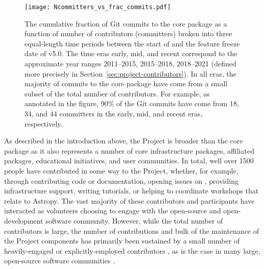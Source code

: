 \documentclass[modern]{aastex631}
\begin{document}
\begin{figure}[t!]
    \begin{centering}
      \texttt{[image: Ncommitters\_vs\_frac\_commits.pdf]}
        \caption{
            The cumulative fraction of Git commits to the \astropypkg core
            package as a function of number of contributors (committers) broken
            into three equal-length time periods between the start of \astropy
            and the feature freeze date of v5.0.
            The time eras early, mid, and recent correspond to the approximate
            year ranges 2011--2015, 2015--2018, 2018--2021 (defined more
            precisely in Section~\ref{sec:project-contributors}).
            In all eras, the majority of commits to the \astropypkg core package
            have come from a small subset of the total number of contributors.
            For example, as annotated in the figure, 90\% of the Git commits
            have come from 18, 34, and 44 committers in the early, mid, and
            recent eras, respectively.
        }
        \label{fig:contributor-summary:Ncommitters}
    \end{centering}
\end{figure}

As described in the introduction above, the \astropy Project is broader than the
core \astropypkg package as it also represents a number of core infrastructure
packages, affiliated packages, educational initiatives, and user communities.
In total, well over 1500 people have contributed in some way to the Project,
whether, for example, through contributing code or documentation, opening issues
on \github, providing infrastructure support, writing tutorials, or helping to
coordinate workshops that relate to Astropy.
The vast majority of these contributors and participants have interacted as
volunteers choosing to engage with the open-source and open-development software
community.
However, while the total number of contributors is large, the number of
contributions and bulk of the maintenance of the \astropy Project components has
primarily been sustained by a small number of heavily-engaged or
explicitly-employed contributors \citep[see, e.g., ][]{astropy:2018}, as is the
case in many large, open-source software communities
\citep[e.g.,][]{numpy:nature}.
\end{document}
